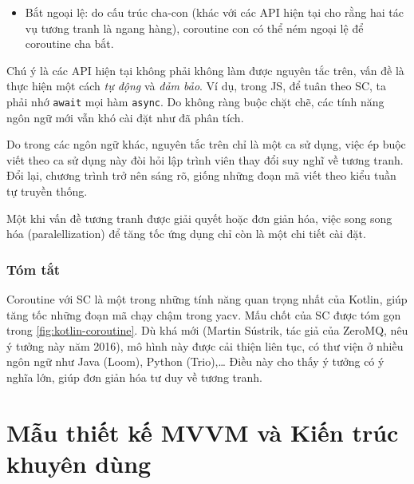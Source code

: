 \documentclass[../../thesis]{subfiles}
\begin{document}
\begin{itemize}[resume, before = \vspace*{-\dimexpr\topsep+\partopsep\relax}]
    \item
        Bắt ngoại lệ: do cấu trúc cha-con (khác với các API hiện tại cho rằng
        hai tác vụ tương tranh là ngang hàng), coroutine con có thể ném ngoại lệ
        để coroutine cha bắt.
\end{itemize}

Chú ý là các API hiện tại không phải không làm được nguyên tắc trên, vấn đề là
thực hiện một cách \emph{tự động} và \emph{đảm bảo}. Ví dụ, trong JS, để tuân
theo SC, ta phải nhớ \texttt{await} mọi hàm \texttt{async}. Do không ràng buộc
chặt chẽ, các tính năng ngôn ngữ mới vẫn khó cài đặt như đã phân tích.

Do trong các ngôn ngữ khác, nguyên tắc trên chỉ là một ca sử dụng, việc ép buộc
viết theo ca sử dụng này đòi hỏi lập trình viên thay đổi suy nghĩ về tương
tranh. Đổi lại, chương trình trở nên sáng rõ, giống những đoạn mã viết theo kiểu
tuần tự truyền thống.

Một khi vấn đề tương tranh được giải quyết hoặc đơn giản hóa, việc song song hóa
(paralellization) để tăng tốc ứng dụng chỉ còn là một chi tiết cài đặt.

\subsubsection{Tóm tắt}

Coroutine với SC là một trong những tính năng quan trọng nhất của Kotlin, giúp
tăng tốc những đoạn mã chạy chậm trong yacv. Mấu chốt của SC được tóm gọn trong
\autoref{fig:kotlin-coroutine}. Dù khá mới (Martin Sústrik, tác giả của ZeroMQ,
nêu ý tưởng này năm 2016), mô hình này được cải thiện liên tục, có thư viện ở
nhiều ngôn ngữ như Java (Loom), Python (Trio),\ldots{} Điều này cho thấy ý tưởng
có ý nghĩa lớn, giúp đơn giản hóa tư duy về tương tranh.



\section{Mẫu thiết kế MVVM và Kiến trúc khuyên dùng}\label{sec:mvvm-app-arch}
\end{document}
